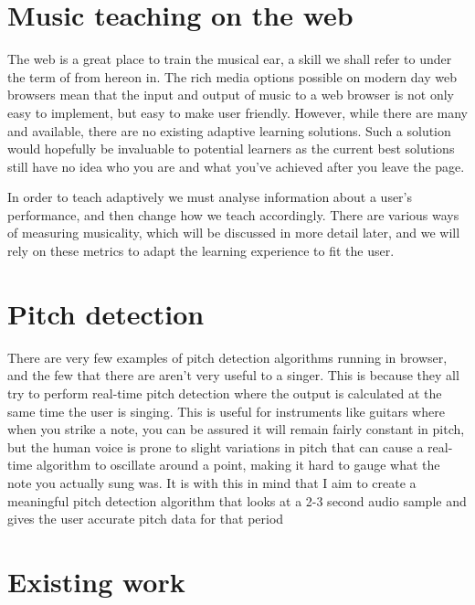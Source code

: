 \section{Music teaching on the web}

\vspace{1em}
\par
The web is a great place to train the musical ear, a skill we shall refer to under the term of  from hereon in. The rich media options possible on modern day web browsers mean that the input and output of music to a web browser is not only easy to implement, but easy to make user friendly. However, while there are many  and  available, there are no existing adaptive learning solutions. Such a solution would hopefully be invaluable to potential learners as the current best solutions still have no idea who you are and what you've achieved after you leave the page.
\par
In order to teach adaptively we must analyse information about a user's performance, and then change how we teach accordingly. 
There are various ways of measuring musicality, which will be discussed in more detail later, and we will rely on these metrics to adapt the learning experience to fit the user.

\section{Pitch detection}
There are very few examples of pitch detection algorithms running in browser, and the few that there are aren't very useful to a singer\cite{webaudiodemos,audioStretch}. This is because they all try to perform real-time pitch detection where the output is calculated at the same time the user is singing. This is useful for instruments like guitars where when you strike a note, you can be assured it will remain fairly constant in pitch, but the human voice is prone to slight variations in pitch that can cause a real-time algorithm to oscillate around a point, making it hard to gauge what the note you actually sung was. It is with this in mind that I aim to create a meaningful pitch detection algorithm that looks at a 2-3 second audio sample and gives the user accurate pitch data for that period

\section{Existing work}


